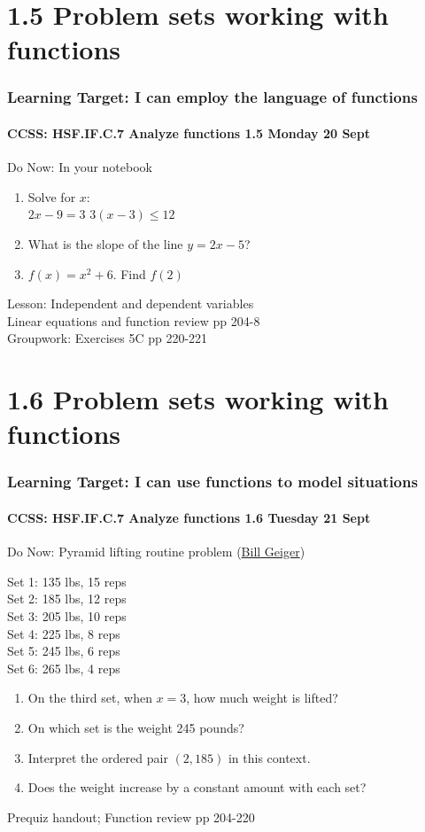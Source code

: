 \documentclass{beamer}
\begin{document}
  \section{1.5 Problem sets working with functions}
  \frame
  {
    \frametitle{Learning Target: I can employ the language of functions}
    \framesubtitle{CCSS: HSF.IF.C.7 Analyze functions \hfill \alert{1.5 Monday 20 Sept}}

    \begin{block}{Do Now: In your notebook}
    \begin{enumerate}
      \item Solve for $x$: \\
      \hspace{1cm} $2x-9=3$ \hspace{1cm}  $3(x-3) \leq 12$
      \item What is the slope of the line $y=2x-5$?
      \item $f(x) = x^2 +6$. Find $f(2)$
    \end{enumerate}
    \end{block}
    Lesson: Independent and dependent variables\\[5pt]
    Linear equations and function review pp 204-8\\[5pt]
    Groupwork: Exercises 5C pp 220-221\\[5pt]
  }

  \section{1.6 Problem sets working with functions}
  \frame
  {
    \frametitle{Learning Target: I can use functions to model situations}
    \framesubtitle{CCSS: HSF.IF.C.7 Analyze functions \hfill \alert{1.6 Tuesday 21 Sept}}

    \begin{block}{Do Now: Pyramid lifting routine problem 
      (\href{https://www.bodybuilding.com/content/build-muscle-and-strength-with-pyramid-training.html}{Bill Geiger})}
      \begin{center}
          Set 1: 135 lbs, 15 reps\\
          Set 2: 185 lbs, 12 reps\\
          Set 3: 205 lbs, 10 reps\\
          Set 4: 225 lbs, 8 reps\\
          Set 5: 245 lbs, 6 reps\\
          Set 6: 265 lbs, 4 reps
    \end{center}
    \end{block}
    \begin{enumerate}
      \item On the third set, when $x=3$, how much weight is lifted?
      \item On which set is the weight 245 pounds?
      \item Interpret the ordered pair $(2,185)$ in this context.
      \item Does the weight increase by a constant amount with each set?
    \end{enumerate}
    Prequiz handout; 
    Function review pp 204-220
  }
\end{document}
